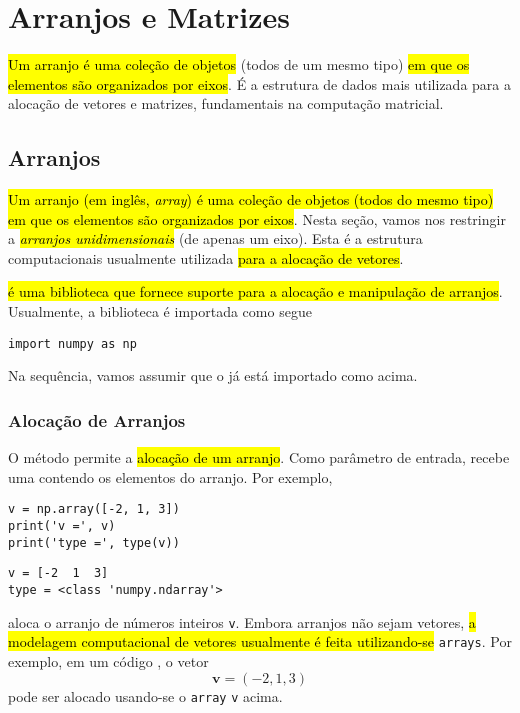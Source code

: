 \chapter{Arranjos e Matrizes}\label{cap_arr}

\hl{Um arranjo é uma coleção de objetos} (todos de um mesmo tipo) \hl{em que os elementos são organizados por eixos}. É a estrutura de dados mais utilizada para a alocação de vetores e matrizes, fundamentais na computação matricial.

\section{Arranjos}\label{cap_arr_sec_arr}

\hl{Um arranjo (em inglês, \textit{array}) é uma coleção de objetos (todos do mesmo tipo) em que os elementos são organizados por eixos}. Nesta seção, vamos nos restringir a \hl{\emph{arranjos unidimensionais}} (de apenas um eixo). Esta é a estrutura computacionais usualmente utilizada \hl{para a alocação de vetores}.

\hl{{\numpy} é uma biblioteca {\python} que fornece suporte para a alocação e manipulação de arranjos}. Usualmente, a biblioteca é importada como segue

\begin{lstlisting}
import numpy as np
\end{lstlisting}

Na sequência, vamos assumir que o {\numpy} já está importado como acima.

\subsection{Alocação de Arranjos}

O método {\PYTHONnumpyDOTarray} permite a \hl{alocação de um arranjo}. Como parâmetro de entrada, recebe uma {\PYTHONlist} contendo os elementos do arranjo. Por exemplo,

\begin{lstlisting}
v = np.array([-2, 1, 3])
print('v =', v)
print('type =', type(v))
\end{lstlisting}

\begin{verbatim}
v = [-2  1  3]
type = <class 'numpy.ndarray'>  
\end{verbatim}

aloca o arranjo de números inteiros \lstinline+v+. Embora arranjos não sejam vetores, \hl{a modelagem computacional de vetores usualmente é feita utilizando-se} \texttt{arrays}. Por exemplo, em um código {\python}, o vetor
\begin{equation}
  \pmb{v} = (-2, 1, 3)
\end{equation}
pode ser alocado usando-se o \texttt{array} \lstinline+v+ acima.

